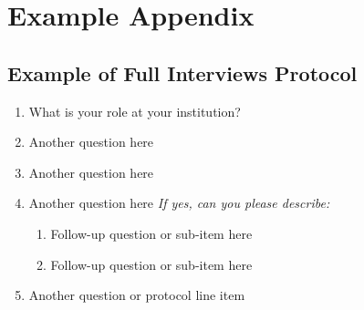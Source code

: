 
\chapter{Example Appendix}

\section{Example of Full Interviews Protocol}
\label{sec:interview_protocol}
\begin{enumerate}
    \item What is your role at your institution?
    \item Another question here
    \item Another question here
    \item Another question here
        \textit{If yes, can you please describe:}
        \begin{enumerate}
            \item Follow-up question or sub-item here
            \item Follow-up question or sub-item here
        \end{enumerate}
    \item Another question or protocol line item
\end{enumerate}

